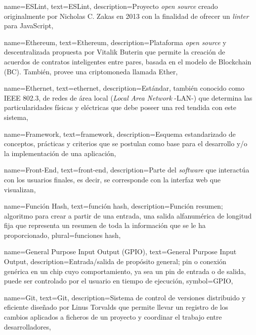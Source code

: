 {
    name={ESLint},
    text={ESLint},
    description={Proyecto \textit{open source} creado originalmente por Nicholas C. Zakas en 2013 con la finalidad de ofrecer un \textit{linter} para JavaScript},
}

{
    name={Ethereum},
    text={Ethereum},
    description={Plataforma \textit{open source} y descentralizada propuesta por Vitalik Buterin que permite la creación de acuerdos de contratos inteligentes entre pares, basada en el modelo de Blockchain (BC). También, provee una criptomoneda llamada Ether},
}

{
    name={Ethernet},
    text={ethernet},
    description={Estándar, también conocido como IEEE 802.3, de redes de área local (\textit{Local Area Network} -LAN-) que determina las particularidades físicas y eléctricas que debe poseer una red tendida con este sistema},
}

{
    name={Framework},
    text={framework},
    description={Esquema estandarizado de conceptos, prácticas y criterios que se postulan como base para el desarrollo y/o la implementación de una aplicación},
}

{
    name={Front-End},
    text={front-end},
    description={Parte del \textit{software} que interactúa con los usuarios finales, es decir, se corresponde con la interfaz web que visualizan},
}

{
    name={Función Hash},
    text={función hash},
    description={Función resumen; algoritmo para crear a partir de una entrada, una salida alfanumérica de longitud fija que representa un resumen de toda la información que se le ha proporcionado},
    plural={funciones hash},
}

{
    name={General Purpose Input Output (GPIO)},
    text={General Purpose Input Output},
    description={Entrada/salida de propósito general; pin o conexión genérica en un chip cuyo comportamiento, ya sea un pin de entrada o de salida, puede ser controlado por el usuario en tiempo de ejecución},
    symbol={GPIO},
}

{
    name={Git},
    text={Git},
    description={Sistema de control de versiones distribuido y eficiente diseñado por Linus Torvalds que permite llevar un registro de los cambios aplicados a ficheros de un proyecto y coordinar el trabajo entre desarrolladores},
}

